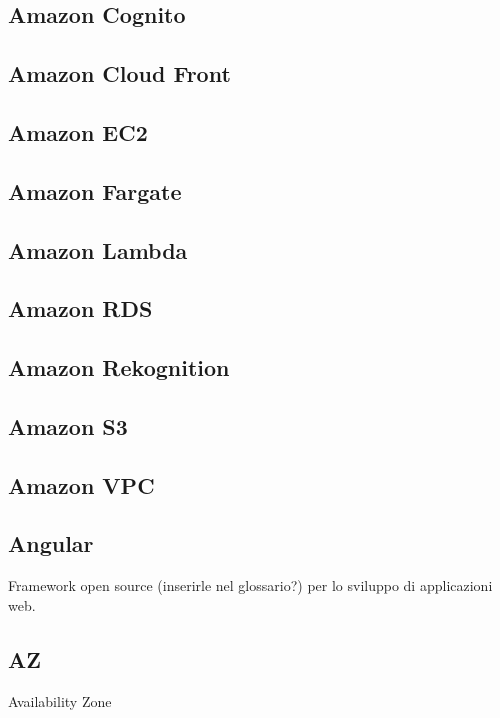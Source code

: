 \documentclass{classes/base}
\begin{document}
        \subsection*{Amazon Cognito}

        \subsection*{Amazon Cloud Front}

        \subsection*{Amazon EC2}

        \subsection*{Amazon Fargate}

        \subsection*{Amazon Lambda}

        \subsection*{Amazon RDS}

        \subsection*{Amazon Rekognition}

        \subsection*{Amazon S3}

        \subsection*{Amazon VPC}

        \subsection*{Angular} 
        Framework open source (inserirle nel glossario?) per lo sviluppo di applicazioni web.

        \subsection*{AZ}
        Availability Zone
    
\end{document}

